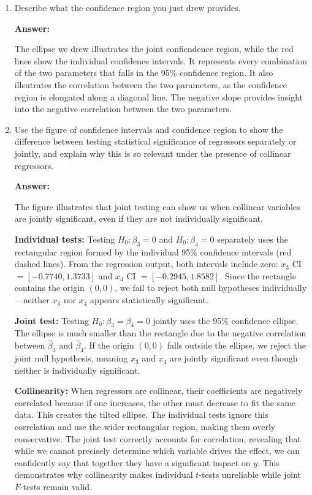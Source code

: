 \documentclass[12pt,a4paper]{article}
\begin{document}
\begin{enumerate}[label=(\roman*)]
  \item Describe what the confidence region you just drew provides.
  
  \textbf{Answer:} 

  The ellipse we drew illustrates the joint confiendence region, while the red lines show the individual confidence intervals.
  It represents every combination of the two parameters that falls in the 95\% confidence region. It also illsutrates the
  correlation between the two parameters, as the confidence region is elongated along a diagonal line. The negative slope provides 
  insight into the negative correlation between the two parameters.
  
  \item Use the figure of confidence intervals and confidence region to show the difference between testing statistical significance of regressors separately or jointly, and explain why this is so relevant under the presence of collinear regressors.
  
  \textbf{Answer:} 

The figure illustrates that joint testing can show us when collinear variables are jointly significant,
even if they are not individually significant.

\textbf{Individual tests:} Testing $H_0: \beta_3=0$ and 
$H_0: \beta_4=0$ separately uses the rectangular region formed by the 
individual 95\% confidence intervals (red dashed lines). From the regression output,
both intervals include zero: $x_3$ CI 
$= [-0.7740, 1.3733]$ and $x_4$ CI $= [-0.2945, 1.8582]$. Since the 
rectangle contains the origin $(0,0)$, we fail to reject both null 
hypotheses individually---neither $x_3$ nor $x_4$ appears statistically 
significant.

\textbf{Joint test:} Testing $H_0: \beta_3=\beta_4=0$ jointly uses the 
95\% confidence ellipse. The ellipse is much smaller than the rectangle 
due to the negative correlation between $\hat{\beta}_3$ and 
$\hat{\beta}_4$. If the origin $(0,0)$ falls outside the ellipse, we 
reject the joint null hypothesis, meaning $x_3$ and $x_4$ are jointly 
significant even though neither is individually significant.

\textbf{Collinearity:} When regressors are collinear, their 
coefficients are negatively correlated because if one increases, the other
must decrease to fit the same 
data. This creates the tilted ellipse. The individual tests ignore this 
correlation and use the wider rectangular region, making them overly 
conservative. The joint test correctly accounts for correlation, 
revealing that while we cannot precisely determine which variable drives 
the effect, we can confidently say that together they have a significant 
impact on $y$. This demonstrates why collinearity makes individual 
$t$-tests unreliable while joint $F$-tests remain valid.


\end{enumerate}
\end{document}
